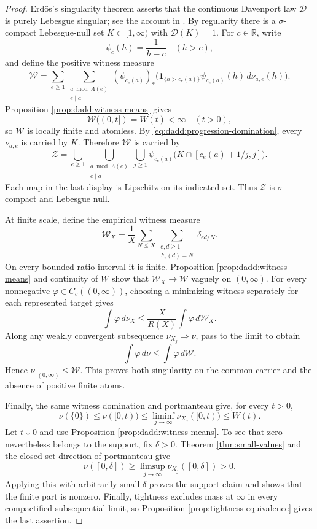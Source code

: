 \documentclass[11pt,letterpaper,reqno]{amsart}
\numberwithin{equation}{section}
\theoremstyle{remark}
\newcommand{\R}{\mathbb{R}}
\newcommand{\1}{\mathbf 1}
\renewcommand{\leq}{\leqslant}
\renewcommand{\geq}{\geqslant}
\begin{document}
\begin{proof}
Erd\H{o}s's singularity theorem asserts that the continuous Davenport
law $\mathcal{D}$ is purely Lebesgue singular; see the account in
\cite[p.~59]{ErdosDistribution}.
By regularity there is a $\sigma$-compact Lebesgue-null set
$K\subset[1,\infty)$ with $\mathcal{D}(K)=1$.
For $c\in\R$, write
\[
 \psi_c(h)=\frac1{h-c}\quad(h>c),
\]
and define the positive witness measure
\[
 \mathcal{W}
 =\sum_{e\geq1}
 \sum_{\substack{a\bmod \Lambda(e)\\e\mid a}}
 (\psi_{c_e(a)})_*
 \bigl(\boldsymbol1_{\{h>c_e(a)\}}
 \psi_{c_e(a)}(h)\,d\nu_{a,e}(h)\bigr).
\]
Proposition \ref{prop:dadd:witness-means} gives
\[
 \mathcal{W}((0,t])=W(t)<\infty\quad(t>0),
\]
so $\mathcal{W}$ is locally finite and atomless. By
\eqref{eq:dadd:progression-domination}, every $\nu_{a,e}$ is
carried by $K$. Therefore $\mathcal{W}$ is carried by
\[
 \mathcal{Z}
 =\bigcup_{e\geq1}
 \bigcup_{\substack{a\bmod \Lambda(e)\\e\mid a}}
 \bigcup_{j\geq1}
 \psi_{c_e(a)}
 \bigl(K\cap[c_e(a)+1/j,j]\bigr).
\]
Each map in the last display is Lipschitz on its indicated set.
Thus $\mathcal{Z}$ is $\sigma$-compact and Lebesgue null.

At finite scale, define the empirical witness measure
\[
 \mathcal{W}_X
 =\frac1X\sum_{N\leq X}
 \sum_{\substack{e,d\geq1\\F_e(d)=N}}
 \delta_{ed/N}.
\]
On every bounded ratio interval it is finite. Proposition
\ref{prop:dadd:witness-means} and continuity of $W$ show that
$\mathcal{W}_X\to\mathcal{W}$ vaguely on $(0,\infty)$. For every
nonnegative $\varphi\in C_c((0,\infty))$, choosing a minimizing
witness separately for each represented target gives
\[
 \int\varphi\,d\nu_X
 \leq\frac X{R(X)}\int\varphi\,d\mathcal{W}_X.
\]
Along any weakly convergent subsequence $\nu_{X_j}\Rightarrow\nu$,
pass to the limit to obtain
\[
 \int\varphi\,d\nu\leq\int\varphi\,d\mathcal{W}.
\]
Hence $\nu|_{(0,\infty)}\leq\mathcal{W}$. This proves both singularity
on the common carrier and the absence of positive finite atoms.

Finally, the same witness domination and portmanteau give, for
every $t>0$,
\[
 \nu(\{0\})
 \leq\nu([0,t))
 \leq\liminf_{j\to\infty}\nu_{X_j}([0,t))
 \leq W(t).
\]
Let $t\downarrow0$ and use
Proposition \ref{prop:dadd:witness-means}. To see that zero nevertheless
belongs to the support, fix $\delta>0$. Theorem \ref{thm:small-values}
and the closed-set direction of portmanteau give
\[
 \nu([0,\delta])
 \geq\limsup_{j\to\infty}\nu_{X_j}([0,\delta])>0.
\]
Applying this with arbitrarily small $\delta$ proves the support claim
and shows that the finite part is nonzero. Finally, tightness excludes
mass at $\infty$ in every compactified subsequential limit, so
Proposition \ref{prop:tightness-equivalence} gives the last assertion.
\end{proof}
\end{document}
